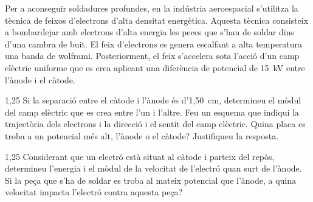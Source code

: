 Per a aconseguir soldadures profundes, en la indústria aeroespacial s'utilitza la tècnica de feixos d'electrons d'alta densitat energètica. Aquesta tècnica consisteix a bombardejar amb electrons d'alta energia les peces que s'han de soldar dins d'una cambra de buit. El feix d'electrons es genera escalfant a alta temperatura una banda de wolframi. Posteriorment, el feix s'accelera sota l'acció d'un camp elèctric uniforme que es crea aplicant una diferència de potencial de 15~kV entre l'ànode i el càtode.


\begin{apartat}{1,25}
Si la separació entre el càtode i l'ànode és d'1,50~cm, determineu el mòdul del camp elèctric que es crea entre l'un i l'altre. Feu un esquema que indiqui la trajectòria dels electrons i la direcció i el sentit del camp elèctric. Quina placa es troba a un potencial més alt, l'ànode o el càtode? Justifiqueu la resposta.
\end{apartat}

\begin{apartat}{1,25}
Considerant que un electró està situat al càtode i parteix del repòs, determineu l'energia i el mòdul de la velocitat de l'electró quan surt de l'ànode. Si la peça que s'ha de soldar es troba al mateix potencial que l'ànode, a quina velocitat impacta l'electró contra aquesta peça?
\end{apartat}

